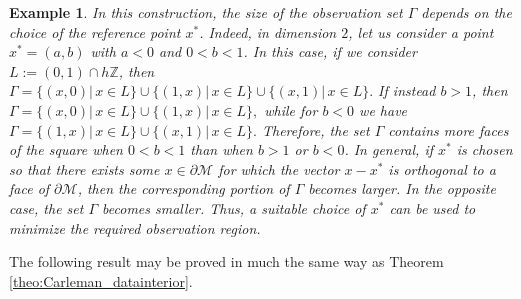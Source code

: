 \documentclass[11pt,oneside,leqno]{amsart}
\numberwithin{equation}{section}
\numberwithin{equation}{section}
\newtheorem{example}[theorem]{Example}
\begin{document}
{\begin{example}
In this construction, the size of the observation set $\Gamma$ depends on the choice of the reference point $x^{*}$. Indeed, in dimension $ 2 $, let us consider a point $ x^{*} = (a,b) $ with $ a < 0$  and $ 0 < b < 1 $. In this case, if we consider $L:=(0,1)\cap h\mathbb{Z}$, then $\Gamma= \{(x,0)|\,x\in L\} \cup \{(1,x)|\, x\in L \} \cup \{(x,1)|\,x\in L\}.$ If instead $b>1$, then $\Gamma= \{(x,0)|\,x\in L\} \cup \{(1,x)|\,x\in L\},$ while for  $b<0$ we have $\Gamma= \{(1,x)|\,x\in L\} \cup \{(x,1)|\,x\in L\}.
$ Therefore, the set $\Gamma$ contains more faces of the square when  $0< b < 1$  than when $b > 1$ or $b < 0$. In general, if $x^{*}$ is chosen so that there exists some $x \in \partial \mathcal{M}$ for which the vector $x - x^{*}$ is orthogonal to a face of $\partial \mathcal{M}$, then the corresponding portion of $\Gamma$ becomes larger. In the opposite case, the set $\Gamma$ becomes smaller. Thus, a suitable choice of $x^{*}$ can be used to minimize the required observation region.
\end{example}

The following result may be proved in much the same way as Theorem \ref{theo:Carleman_datainterior}.

}
\end{document}
